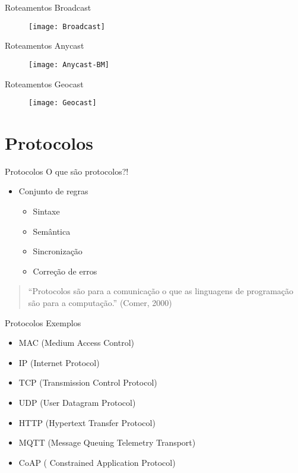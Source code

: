 \documentclass[t]{beamer}
\begin{document}
\begin{frame}{Roteamentos}
Broadcast
\begin{figure}
	\texttt{[image: Broadcast]}
\end{figure}
\end{frame}

\begin{frame}{Roteamentos}
Anycast
\begin{figure}
	\texttt{[image: Anycast-BM]}
\end{figure}
\end{frame}


\begin{frame}{Roteamentos}
Geocast
\begin{figure}
	\texttt{[image: Geocast]}
\end{figure}
\end{frame}

\section{Protocolos}

\begin{frame}{Protocolos}
O que são protocolos?!
\begin{itemize}
	\item Conjunto de regras
	\begin{itemize}
		\item Sintaxe
		\item Semântica
		\item Sincronização
		\item Correção de erros
	\end{itemize}
\end{itemize}
\bigskip
\begin{quotation}
	``Protocolos são para a comunicação o que as linguagens de programação são para a computação.'' (Comer, 2000)
\end{quotation}
\end{frame}

\begin{frame}{Protocolos}
Exemplos
\begin{itemize}
	\item MAC (Medium Access Control)
	\item IP (Internet Protocol)
	\item TCP (Transmission Control Protocol)
	\item UDP (User Datagram Protocol)
	\item HTTP (Hypertext Transfer Protocol)
	\item MQTT (Message Queuing Telemetry Transport)
	\item CoAP (
	Constrained Application Protocol)
\end{itemize}
\end{frame}
\end{document}
